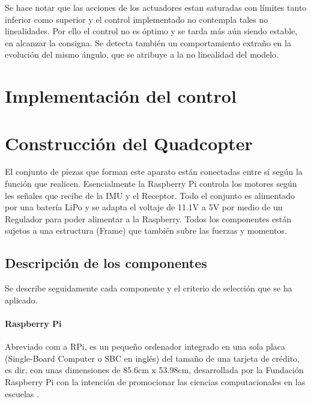 \documentclass[twoside,11pt]{book}
\begin{document}
Se hace notar que las acciones de los actuadores estan saturadas con límites tanto inferior como superior y el control implementado no contempla tales no linealidades. Por ello el control no es óptimo y se tarda más aún siendo estable, en alcanzar la consigna. Se detecta también un comportamiento extraño en la evolución del mismo ángulo, que se atribuye a la no linealidad del modelo.
	
\newpage
\chapter{Implementación del control} \label{implement}

\newpage
\chapter{Construcción del Quadcopter} \label{construc}
El conjunto de piezas que forman este aparato están conectadas entre sí según la función que realicen. Esencialmente la Raspberry Pi controla los motores según les señales que recibe de la IMU y el Receptor. Todo el conjunto es alimentado por una batería LiPo y se adapta el voltaje de 11.1V a 5V por medio de un Regulador para poder alimentar a la Raspberry. Todos los componentes están sujetos a una estructura (Frame) que también subre las fuerzas y momentos.  

\section{Descripción de los componentes}
Se describe seguidamente cada componente y el criterio de selección que se ha aplicado.
\subsubsection*{Raspberry Pi} 
Abreviado com a RPi, es un pequeño ordenador integrado en una sola placa (Single-Board Computer o SBC en inglés) del tamaño de una tarjeta de crédito, es dir, con unas dimensiones de 85.6cm x 53.98cm, desarrollada por la Fundación Raspberry Pi con la intención de promocionar las ciencias computacionales en las escuelas \cite{RPiWiki}. 
\end{document}
